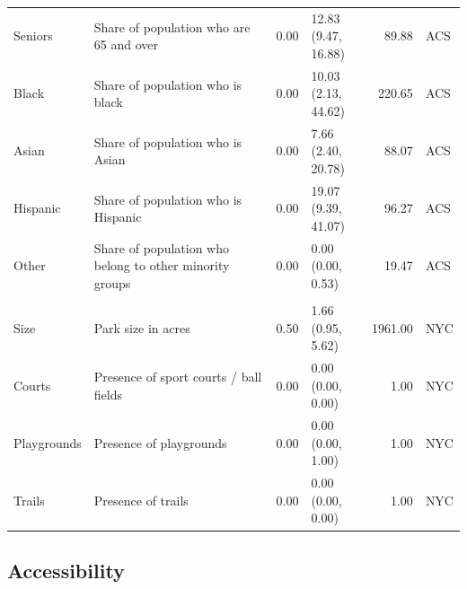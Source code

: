 \documentclass[shortAfour,sageh.bst]{sagej}
\begin{document}
\begin{table}
{\begin{tabular}[t]{l>{\raggedright\arraybackslash}p{2in}rlrl}
\hspace{1em}Seniors & Share of population who are 65 and over & 0.00 & \makecell{12.83\\ (9.47, 16.88)} & 89.88 & ACS\\
\hspace{1em}Black & Share of population who is black & 0.00 & \makecell{10.03\\ (2.13, 44.62)} & 220.65 & ACS\\
\hspace{1em}Asian & Share of population who is Asian & 0.00 & \makecell{7.66\\ (2.40, 20.78)} & 88.07 & ACS\\
\hspace{1em}Hispanic & Share of population who is Hispanic & 0.00 & \makecell{19.07\\ (9.39, 41.07)} & 96.27 & ACS\\
\hspace{1em}Other & Share of population who belong to other minority groups & 0.00 & \makecell{0.00\\ (0.00, 0.53)} & 19.47 & ACS\\
\addlinespace[0.3em]
\multicolumn{6}{l}{\textbf{Park Variables, N = 1277}}\\
\hspace{1em}Size & Park size in acres & 0.50 & \makecell{1.66\\ (0.95, 5.62)} & 1961.00 & NYC\\
\hspace{1em}Courts & Presence of sport courts / ball fields & 0.00 & \makecell{0.00\\ (0.00, 0.00)} & 1.00 & NYC\\
\hspace{1em}Playgrounds & Presence of playgrounds & 0.00 & \makecell{0.00\\ (0.00, 1.00)} & 1.00 & NYC\\
\hspace{1em}Trails & Presence of trails & 0.00 & \makecell{0.00\\ (0.00, 0.00)} & 1.00 & NYC\\
\bottomrule
\end{tabular}}
\end{table}

\hypertarget{accessibility}{%
\subsection{Accessibility}\label{accessibility}}
\end{document}
